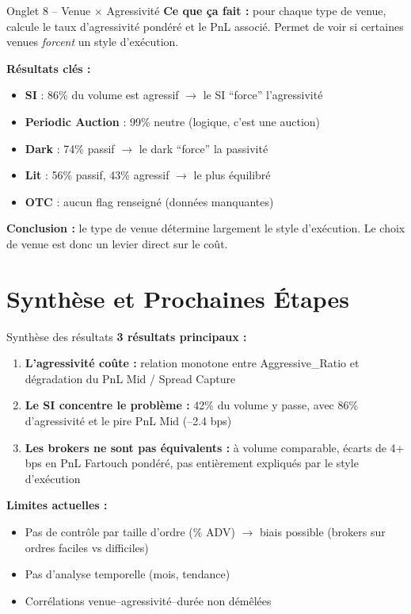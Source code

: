\documentclass[10pt]{beamer}
\begin{document}
\begin{frame}{Onglet 8 -- Venue $\times$ Agressivité}
\textbf{Ce que ça fait :} pour chaque type de venue, calcule le taux d'agressivité pondéré et le PnL associé. Permet de voir si certaines venues \textit{forcent} un style d'exécution.

\vspace{0.2cm}
\textbf{Résultats clés :}
\begin{itemize}
    \item \textbf{SI} : 86\% du volume est agressif $\rightarrow$ le SI ``force'' l'agressivité
    \item \textbf{Periodic Auction} : 99\% neutre (logique, c'est une auction)
    \item \textbf{Dark} : 74\% passif $\rightarrow$ le dark ``force'' la passivité
    \item \textbf{Lit} : 56\% passif, 43\% agressif $\rightarrow$ le plus équilibré
    \item \textbf{OTC} : aucun flag renseigné (données manquantes)
\end{itemize}

\vspace{0.2cm}
\textbf{Conclusion :} le type de venue détermine largement le style d'exécution. Le choix de venue est donc un levier direct sur le coût.
\end{frame}

\section{Synthèse et Prochaines Étapes}

\begin{frame}{Synthèse des résultats}
\textbf{3 résultats principaux :}

\begin{enumerate}
    \item \textbf{L'agressivité coûte :} relation monotone entre Aggressive\_Ratio et dégradation du PnL Mid / Spread Capture
    \item \textbf{Le SI concentre le problème :} 42\% du volume y passe, avec 86\% d'agressivité et le pire PnL Mid (--2.4 bps)
    \item \textbf{Les brokers ne sont pas équivalents :} à volume comparable, écarts de 4+ bps en PnL Fartouch pondéré, pas entièrement expliqués par le style d'exécution
\end{enumerate}

\vspace{0.3cm}
\textbf{Limites actuelles :}
\begin{itemize}
    \item Pas de contrôle par taille d'ordre (\% ADV) $\rightarrow$ biais possible (brokers sur ordres faciles vs difficiles)
    \item Pas d'analyse temporelle (mois, tendance)
    \item Corrélations venue--agressivité--durée non démêlées
\end{itemize}
\end{frame}
\end{document}
